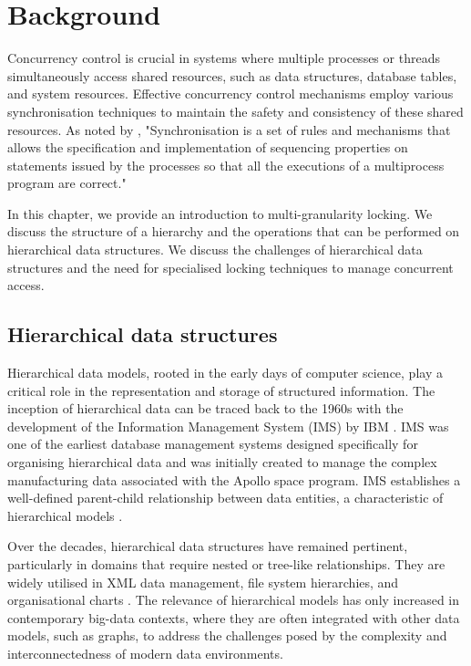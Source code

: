 %

\chapter{Background} \label{chap:background}

\minitoc

Concurrency control is crucial in systems where multiple processes or threads simultaneously access shared resources, such as data structures, database tables, and system resources. Effective concurrency control mechanisms employ various synchronisation techniques to maintain the safety and consistency of these shared resources. As noted by \citet{DBLP:books/daglib/0030596}, "Synchronisation is a set of rules and mechanisms that allows the specification and implementation of sequencing properties on statements issued by the processes so that all the executions of a multiprocess program are correct."

In this chapter, we provide an introduction to multi-granularity locking. We discuss the structure of a hierarchy and the operations that can be performed on hierarchical data structures. We discuss the challenges of hierarchical data structures and the need for specialised locking techniques to manage concurrent access. 



\section{Hierarchical data structures}

Hierarchical data models, rooted in the early days of computer science, play a critical role in the representation and storage of structured information. The inception of hierarchical data can be traced back to the 1960s with the development of the Information Management System (IMS) by IBM \cite{IBMIMS}. IMS was one of the earliest database management systems designed specifically for organising hierarchical data and was initially created to manage the complex manufacturing data associated with the Apollo space program. IMS establishes a well-defined parent-child relationship between data entities, a characteristic of hierarchical models \cite{DBLP:books/daglib/0006734}.

Over the decades, hierarchical data structures have remained pertinent, particularly in domains that require nested or tree-like relationships. They are widely utilised in XML data management, file system hierarchies, and organisational charts \cite{DBLP:books/mk/BunemanSA99}. The relevance of hierarchical models has only increased in contemporary big-data contexts, where they are often integrated with other data models, such as graphs, to address the challenges posed by the complexity and interconnectedness of modern data environments.

